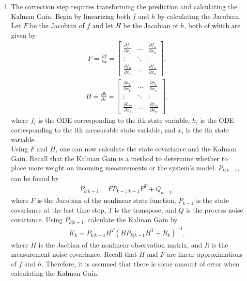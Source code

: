 \begin{enumerate}
  
  \item The correction step requires transforming the prediction and calculating the Kalman Gain. Begin by linearizing both $f$ and $h$ by calculating the Jacobian. Let $F$ be the Jacobian of $f$ and let $H$ be the Jacobian of $h$, both of which are given by
    \begin{align*}
      F= \frac{\partial f}{\partial x} =
      \begin{bmatrix}
           \frac{\partial f_1}{\partial x_1} & \hdots & \frac{\partial f_n}{\partial x_n} \\
           \vdots & \ddots & \vdots \\
           \frac{\partial f_n}{\partial x_1}  & \hdots & \frac{\partial f_n}{\partial x_n}
         \end{bmatrix}  ,
  \end{align*}
      \begin{align*}
      H = \frac{\partial h}{\partial x} =
     \begin{bmatrix}
           \frac{\partial h_1}{\partial x_1} & \hdots & \frac{\partial h_1}{\partial x_n} \\
           \vdots & \ddots & \vdots \\
           \frac{\partial h_m}{\partial x_1}  & \hdots & \frac{\partial h_{m}}{\partial x_n}
         \end{bmatrix} ,
  \end{align*}
  where $f_i $ is the ODE corresponding to the ith state variable, $h_i$ is the ODE corresponding to the ith measurable state variable, and $x_i$ is the ith state variable. \\
  
  \noindent Using $F$ and $H$, one can now calculate the state covariance and the Kalman Gain.  Recall that the Kalman Gain is a method to determine whether to place more weight on incoming measurements or the system's model. $P_{k | k - 1}$, can be found by
    \begin{align*} 
        P_{k | k -1} = F P_{k-1|k - 1} F^T + Q_{k-1} ,
        \end{align*}
       where $F$ is the Jacobian of the nonlinear state function, $P_{k - 1} $ is the state covariance at the last time step, $T$ is the transpose, and $Q$ is the process noise covariance. Using $P_{k | k - 1}$, calculate the Kalman Gain by
         \begin{align*} 
        K_k = P_{k | k - 1} H^T (H P_{k | k - 1} H^T + R_k)^{-1},
    \end{align*}
    where $H$ is the Jacbian of the nonlinear observation matrix, and $R$ is the measurement noise covariance.
    Recall that $H$ and $F$ are linear approximations of $f$ and $h$. Therefore, it is assumed that there is some amount of error when calculating the Kalman Gain. \\
 

\end{enumerate}
